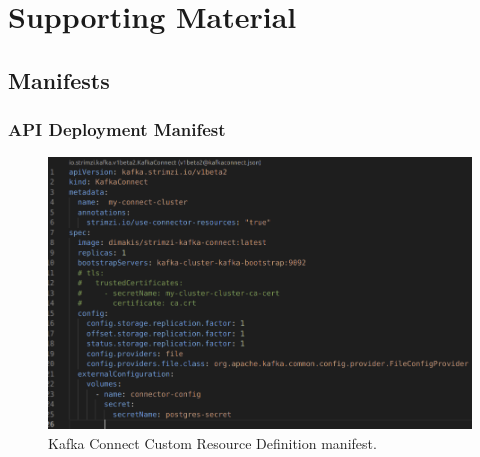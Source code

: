 \chapter{Supporting Material}
\label{cha:app1}

\begin{flushleft}
	\section{Manifests}

	\subsection{API Deployment Manifest}
    \begin{figure} [ht]
        \begin{center}
            \includegraphics[width=1\textwidth]{figures/kafka-connect-manifest.png}
            \caption{Kafka Connect Custom Resource Definition manifest.}
            \label{fig: A.1}
        \end{center}
    \end{figure}
\pagebreak

\end{flushleft}
